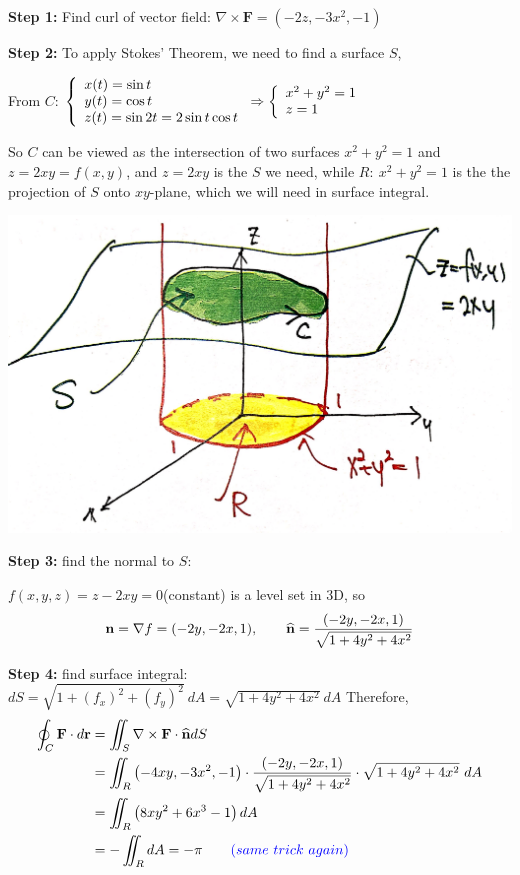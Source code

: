 \begin{spacing}{1.3}
    {\bf Step 1:} Find curl of vector field: $\nabla \times \mathbf{F}=\left(-2 z,-3 x^{2},-1\right)$
    
    {\bf Step 2:} To apply Stokes' Theorem, we need to find a surface $S$,

    From $C$: $\displaystyle \left\{\begin{array}{l}
        x(t)=\sin t\\ y(t)=\cos t\\ z(t)=\sin 2t=2\sin t\cos t
    \end{array} \right. \Rightarrow  
    \left\{\begin{array}{l}
        x^2+y^2=1\\ z=1
    \end{array} \right.$
    
    So $C$ can be viewed as the intersection of two surfaces $x^2+y^2=1$ and $z=2xy=f(x,y)$,
    and $z=2xy$ is the $S$ we need, while $R:\ x^2+y^2=1$ is the the projection of $S$
    onto $xy$-plane, which we will need in surface integral.
    \begin{center}
        \includegraphics[scale=0.1]{images/Ch16-ex4.5.JPG}
    \end{center}

    {\bf Step 3:} find the normal to $S$:
    
    $f(x, y, z)=z-2 x y=0$(constant) is a level set in 3D, so 
    $$\mathbf{n}=\nabla f=(-2 y,-2 x, 1),\qquad \widehat{\bf n}=\frac{(-2 y,-2 x, 1)}{\sqrt{1+4y^2+4x^2}}$$
    
    {\bf Step 4:} find surface integral:
    $dS=\sqrt{1+(f_x)^2+(f_y)^2}\ dA=\sqrt{1+4y^2+4x^2}\ dA$
    Therefore,
    $$\begin{aligned}
    \oint_{C} \mathbf{F} \cdot d \mathbf{r} &=\iint_{S} \nabla \times \mathbf{F} \cdot \widehat{\mathbf{n}} d S \\
    &=\iint_{R}\left(-4 x y,-3 x^{2},-1\right) \cdot \frac{(-2 y,-2 x, 1)}{\sqrt{1+4y^2+4x^2}} \cdot \sqrt{1+4y^2+4x^2}\ dA \\
    &=\iint_{R}\left(8 x y^{2}+6 x^{3}-1\right) d A \\
    &=-\iint_R dA = -\pi\qquad {\color{blue}(same\ trick\ again)}
    \end{aligned}$$
    

\end{spacing}
